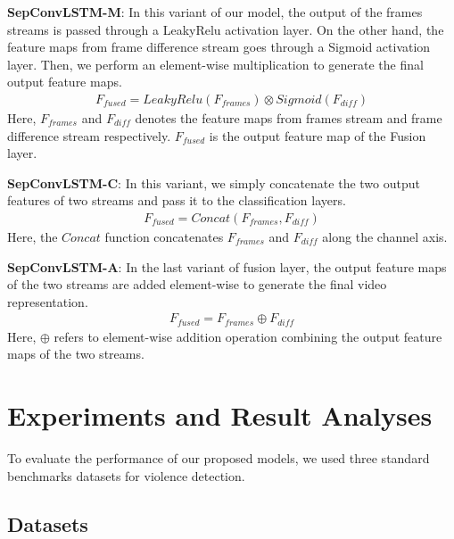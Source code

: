\documentclass[conference]{IEEEtran}
\begin{document}
\textbf{SepConvLSTM-M}: In this variant of our model, the output of the frames streams is passed through a LeakyRelu activation layer. On the other hand, the feature maps from frame difference stream goes through a Sigmoid activation layer. Then, we perform an element-wise multiplication to generate the final output feature maps. 
\begin{equation}
\label{fusion-m-eq}
\begin{split}
F_{fused} =  LeakyRelu( F_{frames} ) \otimes Sigmoid(F_{diff})
\end{split}
\end{equation}
Here, \(F_{frames}\) and \(F_{diff}\) denotes the feature maps from frames stream and frame difference stream respectively. \(F_{fused}\) is the output feature map of the Fusion layer.

\textbf{SepConvLSTM-C}: In this variant, we simply concatenate the two output features of two streams and pass it to the classification layers.  
\begin{equation}
\label{fusion-c-eq}
\begin{split}
F_{fused} =  Concat( F_{frames}, F_{diff} ) 
\end{split}
\end{equation}
Here, the \(Concat\) function concatenates \(F_{frames}\) and \(F_{diff}\) along the channel axis.

\textbf{SepConvLSTM-A}: In the last variant of fusion layer, the output feature maps of the two streams are added element-wise to generate the final video representation. 
\begin{equation}
\label{fusion-a-eq}
\begin{split}
F_{fused} =  F_{frames} \oplus F_{diff}  
\end{split}
\end{equation}
Here, \(\oplus\) refers to element-wise addition operation combining the output feature maps of the two streams.







\section{Experiments and Result Analyses}
To evaluate the performance of our proposed models, we used three standard benchmarks datasets for violence detection.

\subsection{Datasets}
\end{document}
